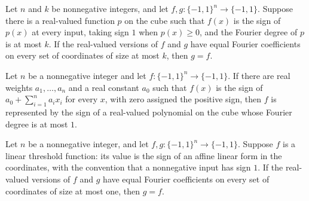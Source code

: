 \begin{theorem}
\label{FABL.eq_of_isPolynomialThreshold_of_fourierCoeff_eq}
\leanok
{}
Let $n$ and $k$ be nonnegative integers, and let $f,g:\{-1,1\}^n\to\{-1,1\}$.
Suppose there is a real-valued function $p$ on the cube such that $f(x)$ is the sign of
$p(x)$ at every input, taking sign $1$ when $p(x)\ge 0$, and the Fourier degree of $p$
is at most $k$. If the real-valued versions of $f$ and $g$ have equal Fourier
coefficients on every set of coordinates of size at most $k$, then $g=f$.
\end{theorem}

\begin{theorem}
\label{FABL.isPolynomialThreshold_one_of_isLinearThreshold}
\leanok
{}
Let $n$ be a nonnegative integer and let $f:\{-1,1\}^n\to\{-1,1\}$. If there are real
weights $a_1,\ldots,a_n$ and a real constant $a_0$ such that $f(x)$ is the sign of
$a_0+\sum_{i=1}^n a_i x_i$ for every $x$, with zero assigned the positive sign, then $f$
is represented by the sign of a real-valued polynomial on the cube whose Fourier degree
is at most $1$.
\end{theorem}

\begin{theorem}
\label{FABL.eq_of_isLinearThreshold_of_fourierCoeff_eq}
\leanok
{}
Let $n$ be a nonnegative integer, and let $f,g:\{-1,1\}^n\to\{-1,1\}$. Suppose $f$
is a linear threshold function: its value is the sign of an affine linear form in the
coordinates, with the convention that a nonnegative input has sign $1$. If the
real-valued versions of $f$ and $g$ have equal Fourier coefficients on every set of
coordinates of size at most one, then $g=f$.
\end{theorem}
